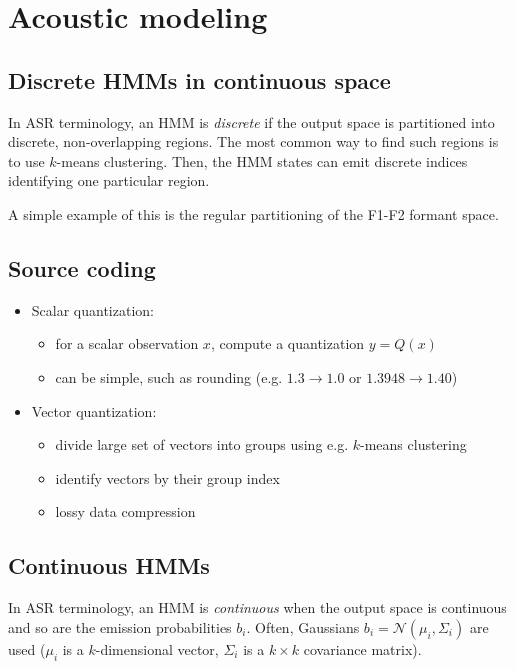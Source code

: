 \newpage

\section{Acoustic modeling}

\subsection{Discrete HMMs in continuous space}

In ASR terminology, an HMM is \textit{discrete} if the output space is partitioned into discrete, non-overlapping regions. The most common way to find such regions is to use $k$-means clustering. Then, the HMM states can emit discrete indices identifying one particular region.

A simple example of this is the regular partitioning of the F1-F2 formant space.

\subsection{Source coding}

\begin{itemize}
    \item Scalar quantization:
        \begin{itemize}
            \item for a scalar observation $x$, compute a quantization $y = Q(x)$
            \item can be simple, such as rounding (e.g. $1.3 \rightarrow 1.0$ or $1.3948 \rightarrow 1.40$)
        \end{itemize}
    \item Vector quantization:
        \begin{itemize}
            \item divide large set of vectors into groups using e.g. $k$-means clustering
            \item identify vectors by their group index
            \item lossy data compression
        \end{itemize}
\end{itemize}

\subsection{Continuous HMMs}

In ASR terminology, an HMM is \textit{continuous} when the output space is continuous and so are the emission probabilities $b_i$. Often, Gaussians $b_i = \mathcal{N}(\mu_i, \Sigma_i)$ are used ($\mu_i$ is a $k$-dimensional vector, $\Sigma_i$ is a $k \times k$ covariance matrix).

